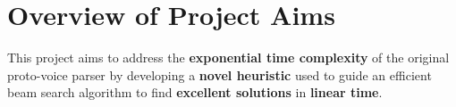 \documentclass[12pt,a4paper,twoside,openany]{report} \usepackage[pdfborder={0 0 0}]{hyperref}    %
\theoremstyle{definition} \newtheorem{definition}{Definition}[section]
\begin{document}
%


\section{Overview of Project Aims} %
\label{sec:protoVoiceParser}
This project aims to address the \textbf{exponential time complexity} of the original proto-voice parser by developing
a \textbf{novel heuristic} used to guide an efficient beam search algorithm to find \textbf{excellent solutions} in
\textbf{linear time}.
\end{document}
